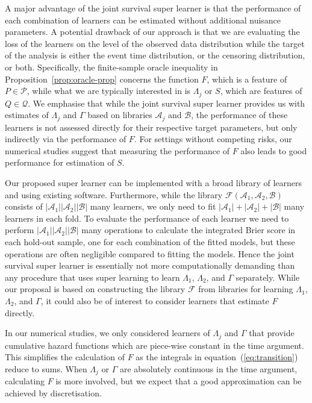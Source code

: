 \documentclass[a4paper,danish]{article}
\theoremstyle{plain} %
\numberwithin{theorem}{section}
\theoremstyle{definition} %
\theoremstyle{remark}
\newcommand{\1}{\mathds{1}}
\begin{document}
A major advantage of the joint survival super learner is that the performance of each
combination of learners can be estimated without additional nuisance
parameters. A potential drawback of our approach is that we are
evaluating the loss of the learners on the level of the observed data
distribution while the target of the analysis is either the event time
distribution, or the censoring distribution, or both.
Specifically, the finite-sample oracle inequality in
Proposition~\ref{prop:oracle-prop} concerns the function \( F \), which
is a feature of \( P \in \mathcal{P} \), while what we are typically
interested in is \( \Lambda_j \) or \( S \), which are features of
\( Q \in \mathcal{Q} \). We emphasise that while the joint survival super learner
provides us with estimates of \( \Lambda_j \) and $\Gamma$ based on
libraries \( \mathcal{A}_j \) and \( \mathcal{B} \), the performance
of these learners is not assessed directly for their respective target
parameters, but only indirectly via the performance of \( F \).  For
settings without competing risks, our numerical studies suggest that
measuring the performance of \( F \) also leads to good performance
for estimation of \( S \).

Our proposed super learner can be implemented with a broad library of learners
and using existing software.
Furthermore, while
the library \( \mathcal{F}(\mathcal{A}_1,\mathcal{A}_2,\mathcal{B}) \) consists
of \( |\mathcal{A}_1||\mathcal{A}_2||\mathcal{B}| \) many learners, we only need to fit
\( |\mathcal{A}_1| +|\mathcal{A}_2| + |\mathcal{B}| \) many learners in each fold. To
evaluate the performance of each learner we need to perform
\( |\mathcal{A}_1||\mathcal{A}_2||\mathcal{B}| \) many operations to calculate the
integrated Brier score in each hold-out sample, one for each combination of the
fitted models, but these operations are often negligible compared to fitting the
models. Hence the joint survival super learner is essentially not more computationally demanding
than any procedure that uses super learning to learn $\Lambda_1$, $\Lambda_2$,
and $\Gamma$ separately. While our proposal is based on constructing the library
\( \mathcal{F} \) from libraries for learning \( \Lambda_1 \), $\Lambda_2$, and
$\Gamma$, it could also be of interest to consider learners that estimate
\( F \) directly.

In our numerical studies, we only considered learners of $\Lambda_j$ and
$\Gamma$ that provide cumulative hazard functions which are piece-wise constant
in the time argument. This simplifies the calculation of \( F \) as the
integrals in equation~(\ref{eq:transition}) reduce to sums. When $\Lambda_j$ or
\( \Gamma \) are absolutely continuous in the time argument, calculating \( F \)
is more involved, but we expect that a good approximation can be achieved by
discretisation.
\end{document}
